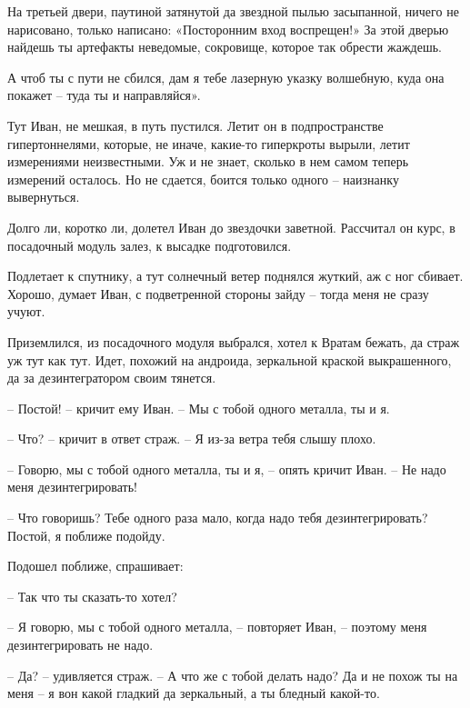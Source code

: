 \documentclass[ebook,oneside,final,openright]{memoir}
\begin{document}
\par
На третьей двери, паутиной затянутой да звездной пылью засыпанной, ничего не нарисовано, только написано: «Посторонним вход воспрещен!» За этой дверью найдешь ты артефакты неведомые, сокровище, которое так обрести жаждешь.\par
\par
А чтоб ты с пути не сбился, дам я тебе лазерную указку волшебную, куда она покажет – туда ты и направляйся».\par
\par
Тут Иван, не мешкая, в путь пустился. Летит он в подпространстве гипертоннелями, которые, не иначе, какие-то гиперкроты вырыли, летит измерениями неизвестными. Уж и не знает, сколько в нем самом теперь измерений осталось. Но не сдается, боится только одного – наизнанку вывернуться.\par
\par
Долго ли, коротко ли, долетел Иван до звездочки заветной. Рассчитал он курс, в посадочный модуль залез, к высадке подготовился.\par
\par
Подлетает к спутнику, а тут солнечный ветер поднялся жуткий, аж с ног сбивает. Хорошо, думает Иван, с подветренной стороны зайду – тогда меня не сразу учуют. \par
\par
 Приземлился, из посадочного модуля выбрался, хотел к Вратам бежать, да страж уж тут как тут. Идет, похожий на андроида, зеркальной краской выкрашенного, да за дезинтегратором своим тянется. \par
 \par
– Постой! – кричит ему Иван. – Мы с тобой одного металла, ты и я. \par
– Что? – кричит в ответ страж. – Я из-за ветра тебя слышу плохо. \par
– Говорю, мы с тобой одного металла, ты и я, – опять кричит Иван. – Не надо меня дезинтегрировать!\par
– Что говоришь? Тебе одного раза мало, когда надо тебя дезинтегрировать? Постой, я поближе подойду. \par
Подошел поближе, спрашивает: \par
– Так что ты сказать-то хотел? \par
– Я говорю, мы с тобой одного металла, – повторяет Иван, – поэтому меня дезинтегрировать не надо. \par
– Да? – удивляется страж. – А что же с тобой делать надо? Да и не похож ты на меня – я вон какой гладкий да зеркальный, а ты бледный какой-то. \par
\end{document}

